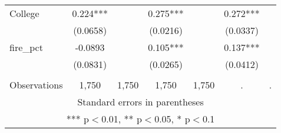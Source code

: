 \begin{tabular}{lcccccc}
College & 0.224*** &  & 0.275*** &  & 0.272*** &  \\
 & (0.0658) &  & (0.0216) &  & (0.0337) &  \\
fire\_pct & -0.0893 &  & 0.105*** &  & 0.137*** &  \\
 & (0.0831) &  & (0.0265) &  & (0.0412) &  \\
 &  &  &  &  &  &  \\
 Observations & 1,750 & 1,750 & 1,750 & 1,750 & . & . \\ \hline
\multicolumn{7}{c}{ Standard errors in parentheses} \\
\multicolumn{7}{c}{ *** p$<$0.01, ** p$<$0.05, * p$<$0.1} \\
\end{tabular}
